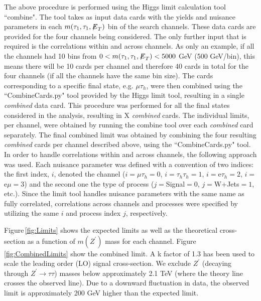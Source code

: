 The above procedure is performed using the Higgs limit calculation tool ``combine". The tool takes as input data cards with the yields and nuisance parameters in 
each $m(\tau_{1},\tau_{1},{\not\mathrel{E}}_T)$ bin of the search channels. These data cards are provided for the four channels being considered. The only further input that 
is required is the correlations within and across channels. As only an example, if all the channels had 10 bins from $0 < m(\tau_{1},\tau_{1},{\not\mathrel{E}}_T) < 5000$ GeV 
(500 GeV/bin), this means there will be 10 cards per channel and therefore 40 cards in total for the four channels (if all the channels have the same bin size).
The cards corresponding to a specific final state, e.g. $\mu\tau_{h}$, were then combined using the ``CombineCards.py" tool provided by the Higgs limit tool, 
resulting in a single \textit{combined} data card. This procedure was performed for all the final states considered in the analysis, resulting in 
X \textit{combined} cards. The individual limits, per channel, were obtained by running the combine tool over each \textit{combined} card separately. The final 
combined limit was obtained by combining the four resulting \textit{combined} cards per channel described above, using the ``CombineCards.py" tool. In order to 
handle correlations within and across channels, the following approach was used. Each nuisance parameter was defined with a convention of two indices: the first 
index, $i$, denoted the channel ($i=\mu\tau_{h}=0$, $i=\tau_{h}\tau_{h}=1$, $i=$e$\tau_{h}=2$, $i=$e$\mu=3$) and the second one the type of process 
($j=$Signal$=0$, $j=$W+Jets$=1$, etc.). Since the limit tool handles nuisance parameters with the same name as fully correlated, correlations across channels and 
processes were specified by utilizing the same $i$ and process index $j$, respectively.

Figure\,\ref{fig:Limits} shows the expected limits as well as the theoretical cross-section as a function of $m(Z^{\prime})$ mass for each channel. 
Figure\,\ref{fig:CombinedLimits} show the combined limit. A k factor of 1.3 has been used to scale the leading order (LO) signal cross-section. 
We exclude $Z^{\prime}$ (decaying through $Z^{\prime}\to\tau\tau$) masses below approximately 2.1 TeV (where the theory line crosses the observed line). Due to a downward fluctuation in data, the observed limit is approximately 200 GeV higher than the expected limit.

